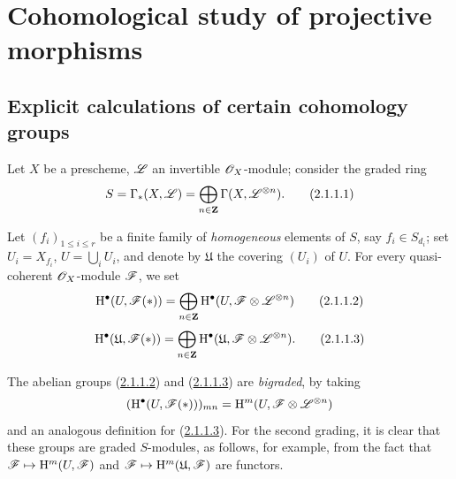 \section{Cohomological study of projective morphisms}
\label{section:III.2}


\subsection{Explicit calculations of certain cohomology groups}
\label{subsection:III.2.1}

\begin{env}[2.1.1]
\label{III.2.1.1}
Let $X$ be a prescheme, $\mathscr{L}$ an invertible $\mathscr{O}_X$-module; consider the graded ring 
\[
\label{III.2.1.1.1}
  S = \Gamma_*(X,\mathscr{L}) = \bigoplus_{n\in\mathbf{Z}} \Gamma(X,\mathscr{L}^{\otimes n}).
  \tag{2.1.1.1}
\]

Let $(f_i)_{1\leq i\leq r}$ be a finite family of \emph{homogeneous} elements of $S$, say $f_i\in S_{d_i}$; set $U_i = X_{f_i}$, $U = \bigcup_i U_i$, and denote by $\mathfrak{U}$ the covering $(U_i)$ of $U$.
For every quasi-coherent $\mathscr{O}_X$-module $\mathscr{F}$, we set
\[
\label{III.2.1.1.2}
  \mathrm{H}^\bullet(U,\mathscr{F}(*)) = \bigoplus_{n\in\mathbf{Z}} \mathrm{H}^\bullet(U,\mathscr{F}\otimes\mathscr{L}^{\otimes n})
  \tag{2.1.1.2}
\]
\[
\label{III.2.1.1.3}
  \mathrm{H}^\bullet(\mathfrak{U},\mathscr{F}(*)) = \bigoplus_{n\in\mathbf{Z}} \mathrm{H}^\bullet(\mathfrak{U},\mathscr{F}\otimes\mathscr{L}^{\otimes n}).
  \tag{2.1.1.3}
\]

The abelian groups (\hyperref[III.2.1.1.2]{2.1.1.2}) and (\hyperref[III.2.1.1.3]{2.1.1.3}) are \emph{bigraded}, by taking
\[
  (\mathrm{H}^\bullet(U,\mathscr{F}(*)))_{mn} = \mathrm{H}^m(U,\mathscr{F}\otimes\mathscr{L}^{\otimes n})
\]
and an analogous definition for (\hyperref[III.2.1.1.3]{2.1.1.3}).
For the second grading, it is clear that these groups are graded $S$-modules, as follows, for example, from the fact that $\mathscr{F}\mapsto\mathrm{H}^m(U,\mathscr{F})$ and $\mathscr{F}\mapsto\mathrm{H}^m(\mathfrak{U},\mathscr{F})$ are functors.
\end{env}


